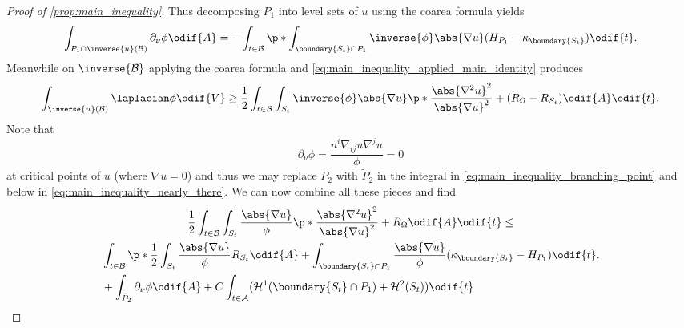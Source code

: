 \documentclass[titlepage,numbers=noenddot,oneside,%
cleardoublepage=empty,paper=a4,fontsize=11pt,%
english,%
]{scrartcl}
\begin{document}
{\begin{proof}[Proof of \cref{prop:main_inequality}]
    Thus decomposing \( P_1 \) into level sets of \( u \) using the coarea formula yields 
    \begin{equation*}
        \int_{P_1\cap \inverse{u}(\mathcal{B})}\partial_{\nu}\phi\odif{A}=-\int_{t\in \mathcal{B}}\p*{\int_{\boundary{S_t}\cap P_1}\inverse{\phi}\abs{\nabla u}(H_{P_1}-\kappa_{\boundary{S_t}})}\odif{t}.
    \end{equation*}
    Meanwhile on \( \inverse{\mathcal{B}} \) applying the coarea formula and \cref{eq:main_inequality_applied_main_identity} produces
    \begin{equation*}
        \int_{\inverse{u}(\mathcal{B})}\laplacian\phi\odif{V}\geq \frac{1}{2}\int_{t\in \mathcal{B}}\int_{S_t}\inverse{\phi}\abs{\nabla u}\p*{\frac{\abs{\nabla^2 u}^2}{\abs{\nabla u}^2}+(R_{\Omega}-R_{S_t})}\odif{A}\odif{t}.
    \end{equation*}
    Note that 
    \begin{equation*}
        \partial_\nu \phi=\frac{n^i \nabla_{ij}u \nabla^j u}{\phi}=0
    \end{equation*} 
    at critical points of \( u \) (where \( \nabla u=0 \)) and thus we may replace \( P_2 \) with \( \tilde{P}_2 \) in the integral in \cref{eq:main_inequality_branching_point} and below in \cref{eq:main_inequality_nearly_there}. We can now combine all these pieces and find
    \begin{multline}\label{eq:main_inequality_nearly_there}
        \frac{1}{2}\int_{t\in \mathcal{B}}\int_{S_t}\frac{\abs{\nabla u}}{\phi}\p*{\frac{\abs{\nabla^2 u}^2}{\abs{\nabla u}^2}+R_{\Omega}}\odif{A}\odif{t}\leq\\
         \begin{aligned}[t]
            &\int_{t\in \mathcal{B}}\p*{\frac{1}{2}\int_{S_t}\frac{\abs{\nabla u}}{\phi}R_{S_t}\odif{A}+\int_{\boundary{S_t}\cap P_1}\frac{\abs{\nabla u}}{\phi}(\kappa_{\boundary{S_t}}-H_{P_1})} \odif{t}  \\
            &+\int_{\tilde{P}_2}\partial_{\nu}\phi\odif{A}+C\int_{t\in \mathcal{A}}(\mathcal{H}^1(\boundary{S_t}\cap P_1)+\mathcal{H}^2(S_t))\odif{t}
         \end{aligned}.
    \end{multline}
    

\end{proof}}
\end{document}
